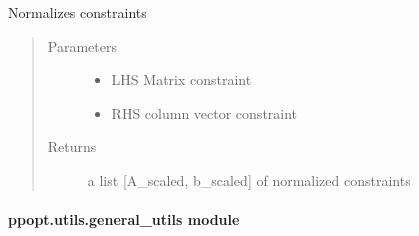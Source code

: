\documentclass[letterpaper,10pt,english]{sphinxmanual}
\begin{document}
\begin{fulllineitems}
\label{\detokenize{ppopt.utils:ppopt.utils.constraint_utilities.scale_constraint}}
\sphinxAtStartPar
Normalizes constraints
\begin{quote}\begin{description}
\item[{Parameters}] \leavevmode\begin{itemize}
\item {} 
\sphinxAtStartPar
{} \textendash{} LHS Matrix constraint

\item {} 
\sphinxAtStartPar
{} \textendash{} RHS column vector constraint

\end{itemize}

\item[{Returns}] \leavevmode
\sphinxAtStartPar
a list {[}A\_scaled, b\_scaled{]} of normalized constraints

\end{description}\end{quote}

\end{fulllineitems}



\paragraph{ppopt.utils.general\_utils module}
\label{\detokenize{ppopt.utils:module-ppopt.utils.general_utils}}\label{\detokenize{ppopt.utils:ppopt-utils-general-utils-module}}
\end{document}
